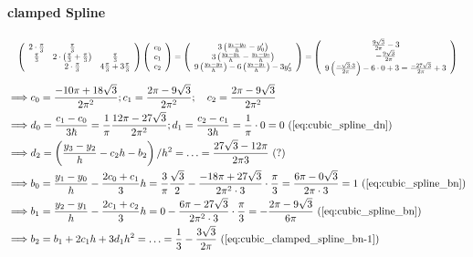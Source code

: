 \paragraph{clamped Spline}
\begin{equation}
\resizebox{1\textwidth}{!}{$
\left(\begin{array}{ccc}
2 \cdot \frac{\pi}{3}& \frac{\pi}{3} & \\
\frac{\pi}{3} & 2 \cdot \left(\frac{\pi}{3}+\frac{\pi}{3}\right) & \frac{\pi}{3} \\
& 2 \cdot \frac{\pi}{3} & 4 \frac{\pi}{3}+3 \frac{\pi}{3}
\end{array}\right)\left(\begin{array}{l}
c_0 \\
c_1  \\
c_2
\end{array}\right)=\left(\begin{array}{c}
3\left(\frac{y_1-y_0}{h}-y_0^{\prime}\right)\\
3\left(\frac{y_2-y_1}{h}-\frac{y_1-y_0}{h}\right) \\
9\left(\frac{y_3-y_2}{h}\right)-6\left(\frac{y_2-y_1}{h}\right)-3 y_3^{\prime}
\end{array}\right)=\left(\begin{array}{c}
\frac{9 \sqrt{3}}{2 \pi}-3\\
-\frac{9 \sqrt{3}}{2 \pi}\\
9\left(\frac{-\sqrt{3} \cdot 3}{2 \pi}\right)-6 \cdot 0+3=\frac{-27 \sqrt{3}}{2 \pi}+3
\end{array}\right)$}
\end{equation}
$$
\begin{aligned}
&\Longrightarrow c_0=\frac{-10 \pi+18 \sqrt{3}}{2 \pi^2} ; c_1=\frac{2 \pi-9 \sqrt{3}}{2 \pi^2} ; \quad c_2=\frac{2 \pi-9 \sqrt{3}}{2 \pi^2}\\
&\Longrightarrow d_0=\frac{c_1-c_0}{3 \hbar}=\frac{1}{\pi} \frac{12 \pi-27 \sqrt{3}}{2 \pi^2} ; d_1=\frac{c_2-c_1}{3 h}=\frac{1}{\pi} \cdot 0=0 \text{ (\autoref{eq:cubic_spline_dn})}\\
&\Longrightarrow d_2=\left(\frac{y_3-y_2}{h}-c_2 h-b_2\right) / h^2=\ldots=\frac{27 \sqrt{3}-12 \pi}{2 \pi 3} \text{ (?)}\\
&\Longrightarrow b_0=\frac{y_1-y_0}{h}-\frac{2 c_0+c_1}{3} h =\frac{3}{\pi} \frac{\sqrt{3}}{2}-\frac{-18 \pi+27 \sqrt{3}}{2 \pi^2 \cdot 3} \cdot \frac{\pi}{3}= \frac{6 \pi-0 \sqrt{3}}{2 \pi \cdot 3}=1 \text{ (\autoref{eq:cubic_spline_bn})}\\
&\Longrightarrow b_1=\frac{y_2-y_1}{h}-\frac{2 c_1+c_2}{3} h=0-\frac{6 \pi-27 \sqrt{3}}{2 \pi^2 \cdot 3} \cdot \frac{\pi}{3}=-\frac{2 \pi-9 \sqrt{3}}{6 \pi} \text{ (\autoref{eq:cubic_spline_bn})}\\
&\Longrightarrow b_2=b_1+2 c_1 h+3 d_1 h^2=\ldots=\frac{1}{3}-\frac{3 \sqrt{3}}{2 \pi} \text{ (\autoref{eq:cubic_clamped_spline_bn-1})}
\end{aligned}
$$

